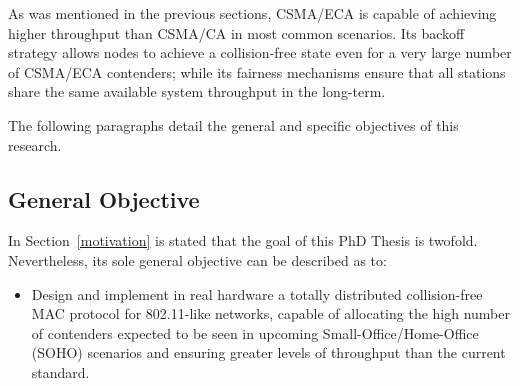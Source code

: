 As was mentioned in the previous sections, CSMA/ECA is capable of achieving higher throughput than CSMA/CA in most common scenarios. Its backoff strategy allows nodes to achieve a collision-free state even for a very large number of CSMA/ECA contenders; while its fairness mechanisms ensure that all stations share the same available system throughput in the long-term.

The following paragraphs detail the general and specific objectives of this research. 

\subsection{General Objective}
In Section~\ref{motivation} is stated that the goal of this PhD Thesis is twofold. Nevertheless, its sole general objective can be described as to:
\begin{itemize}
	\item Design and implement in real hardware a totally distributed collision-free MAC protocol for 802.11-like networks, capable of allocating the high number of contenders expected to be seen in upcoming Small-Office/Home-Office (SOHO) scenarios and ensuring greater levels of throughput than the current standard.
\end{itemize}

